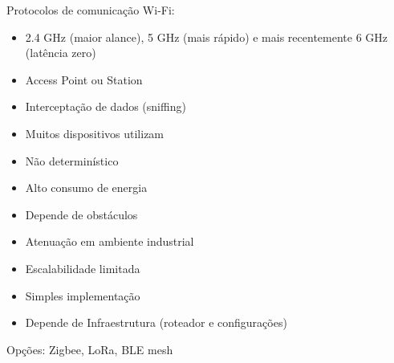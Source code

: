 


\begin{frame}{Protocolos de comunicação}
    Wi-Fi:
    \begin{itemize}
        \item 2.4 GHz (maior alance), 5 GHz (mais rápido) e mais recentemente 6 GHz (latência zero)
        \item Access Point ou Station
        \item Interceptação de dados (sniffing)
        \item Muitos dispositivos utilizam
        \item Não determinístico
        \item Alto consumo de energia
        \item Depende de obstáculos
        \item Atenuação em ambiente industrial
        \item Escalabilidade limitada
        \item Simples implementação
        \item Depende de Infraestrutura (roteador e configurações)
    \end{itemize}

    Opções: Zigbee, LoRa, BLE mesh
\end{frame}
